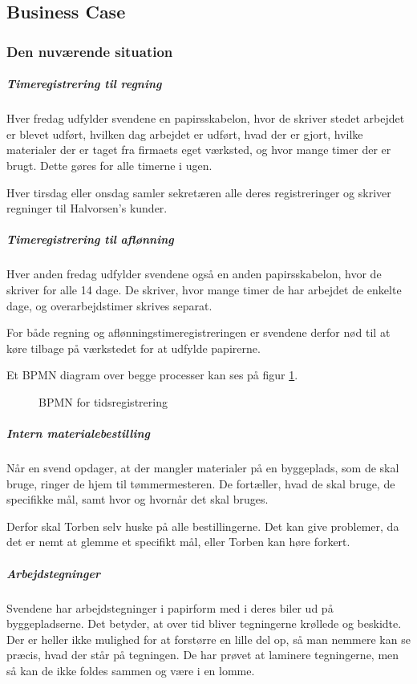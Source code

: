\subsection{Business Case}
\subsubsection{Den nuværende situation}
\subparagraph{Timeregistrering til regning}

    Hver fredag udfylder svendene en papirsskabelon, hvor de skriver stedet arbejdet er blevet udført, hvilken dag arbejdet er udført, hvad der er gjort, hvilke materialer der er taget fra firmaets eget værksted, og hvor mange timer der er brugt.
    Dette gøres for alle timerne i ugen.
    
    Hver tirsdag eller onsdag samler sekretæren alle deres registreringer og skriver regninger til Halvorsen's kunder.

\subparagraph{Timeregistrering til aflønning}
    Hver anden fredag udfylder svendene også en anden papirsskabelon, hvor de skriver for alle 14 dage. De skriver, hvor mange timer de har arbejdet de enkelte dage, og overarbejdstimer skrives separat.
    
    For både regning og aflønningstimeregistreringen er svendene derfor nød til at køre tilbage på værkstedet for at udfylde papirerne.

Et BPMN diagram over begge processer kan ses på figur \ref{fig:BPMN}.
    
\begin{figure}[h]
    \caption{BPMN for tidsregistrering}
    \label{fig:BPMN}
\end{figure}
    
\subparagraph{Intern materialebestilling}
    Når en svend opdager, at der mangler materialer på en byggeplads, som de skal bruge, ringer de hjem til tømmermesteren. De fortæller, hvad de skal bruge, de specifikke mål, samt hvor og hvornår det skal bruges.
    
    Derfor skal Torben selv huske på alle bestillingerne. Det kan give problemer, da det er nemt at glemme et specifikt mål, eller Torben kan høre forkert.
    
\subparagraph{Arbejdstegninger}
    Svendene har arbejdstegninger i papirform med i deres biler ud på byggepladserne.
Det betyder, at over tid bliver tegningerne krøllede og beskidte.
Der er heller ikke mulighed for at forstørre en lille del op, så man nemmere kan se præcis, hvad der står på tegningen.
De har prøvet at laminere tegningerne, men så kan de ikke foldes sammen og være i en lomme.
    

